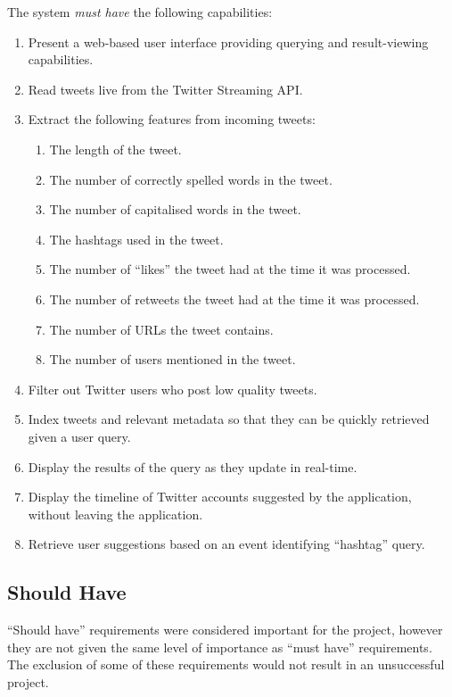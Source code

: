 \documentclass{l4proj}
\begin{document}
    The system \textit{must have} the following capabilities:
    \begin{enumerate}[label=\textbf{M.\arabic*}]
    \item Present a web-based user interface providing querying and result-viewing capabilities.
    \item Read tweets live from the Twitter Streaming API.
    \item Extract the following features from incoming tweets:
        \begin{enumerate}
        \item The length of the tweet.
        \item The number of correctly spelled words in the tweet.
        \item The number of capitalised words in the tweet.
        \item The hashtags used in the tweet.
        \item The number of ``likes'' the tweet had at the time it was processed. 
        \item The number of retweets the tweet had at the time it was processed.
        \item The number of URLs the tweet contains.
        \item The number of users mentioned in the tweet.
        \end{enumerate} 
    \item Filter out Twitter users who post low quality tweets.
   \item Index tweets and relevant metadata so that they can be quickly retrieved given a user query.
   
   \item Display the results of the query as they update in real-time.
   \item Display the timeline of Twitter accounts suggested by the application, without leaving the application. 
   \item Retrieve user suggestions based on an event identifying ``hashtag'' query.
    \end{enumerate}
    
        \subsection{Should Have}
        
        ``Should have'' requirements were considered important for the project, however they are not given the same level of importance as ``must have'' requirements. The exclusion of some of these requirements would not result in an unsuccessful project.
        
\end{document}
